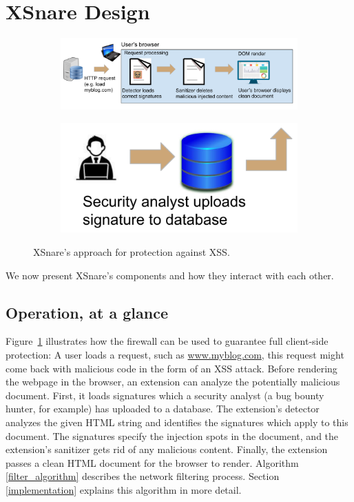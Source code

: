 \section{XSnare Design} \label{xsnare_design}

 \begin{figure}[h]
	\begin{subfigure}[b]{1.0\textwidth}
		\centering
		\includegraphics[scale=0.55]{img/xsnare_top.pdf}
		
	\end{subfigure}
	\hfill
	\begin{subfigure}[b]{0.3\textwidth}
		\includegraphics[scale=0.55]{img/xsnare_bot.pdf}
		
	\end{subfigure}
	\caption{XSnare's approach for protection against XSS.}
	\label{fig:xsnare}
\end{figure}

We now present XSnare's components and how they interact with each other.

\subsection{Operation, at a glance} \label{operation}
  Figure~\ref{fig:xsnare} illustrates how the firewall can be used to guarantee full client-side protection: A user loads a request, such as \url{www.myblog.com}, this request might come back with malicious code in the form of an XSS attack. Before rendering the webpage in the browser, an extension can analyze the potentially malicious document. First, it loads signatures which a security analyst (a bug bounty hunter, for example) has uploaded to a database. The extension's detector analyzes the given HTML string and identifies the signatures which apply to this document. The signatures specify the injection spots in the document, and the extension's sanitizer gets rid of any malicious content. Finally, the extension passes a clean HTML document for the browser to render. Algorithm \ref{filter_algorithm} describes the network filtering process. Section \ref{implementation} explains this algorithm in more detail.
 



